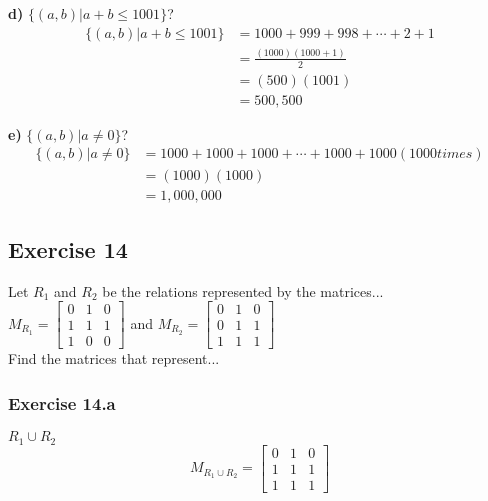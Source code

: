 \documentclass[12pt]{article}
\begin{document}
    \textbf{d)} $\{(a,b) | a+b \leq 1001 \}$?
        \begin{equation}
            \begin{split}
            \{(a,b) | a+b \leq 1001 \} &=1000+999+998+\cdots+2+1\\
            &=\frac{(1000)(1000+1)}{2}\\
            &=(500)(1001)\\
            &=500,500
            \end{split}
        \end{equation}
   
    \textbf{e)} $\{(a,b) | a \neq 0 \}$?
        \begin{equation}
            \begin{split}
            \{(a,b) | a \neq 0 \}&=1000+1000+1000+\cdots + 1000+1000 (1000 times)\\
            &=(1000)(1000)\\
            &= 1,000,000
            \end{split}
    \end{equation}
     
    \subsection{Exercise 14}
    
    Let $R_1$ and $R_2$ be the relations represented by the matrices... \\
    $M_{R_1}=\begin{bmatrix}
        0 & 1 & 0\\
        1 & 1 & 1\\
        1 & 0 & 0
    \end{bmatrix}$ and $M_{R_2} = \begin{bmatrix}
        0 & 1 & 0 \\
        0 & 1 & 1 \\
        1 & 1 & 1
    \end{bmatrix}
    $\\
    Find the matrices that represent...
    \subsubsection{Exercise 14.a}
    $R_1 \cup R_2$
    \begin{equation}
        M_{R_1 \cup R_2} = \begin{bmatrix}
            0 & 1 & 0 \\
            1 & 1 & 1 \\
            1 & 1 & 1
        \end{bmatrix}
    \end{equation}
\end{document}
